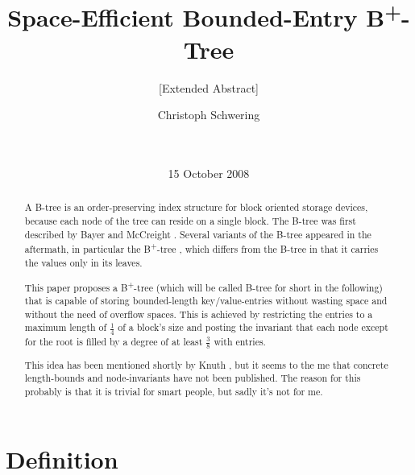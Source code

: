 \documentclass{vldb}
\begin{document}
\title{Space-Efficient Bounded-Entry B\textsuperscript{+}-Tree}
\subtitle{[Extended Abstract]}

\author{
\alignauthor
Christoph Schwering\\
   \\
   \\
}
\date{15 October 2008}


\maketitle

\begin{abstract}
A B-tree is an order-preserving index structure for block oriented storage
devices, because each node of the tree can reside on a single block.
The B-tree was first described by Bayer and McCreight \cite{Bayer}.
Several variants of the B-tree appeared in the aftermath, in particular the
B\textsuperscript{+}-tree \cite{Cormen, KnuthBTree}, which differs from the
B-tree in that it carries the values only in its leaves.

This paper proposes a B\textsuperscript{+}-tree (which will be called B-tree for
short in the following) that is capable of storing bounded-length
key/value-entries without wasting space and without the need of overflow spaces.
This is achieved by restricting the entries to a maximum length of
$\tfrac{1}{4}$ of a block's size and posting the invariant that each node except
for the root is filled by a degree of at least $\tfrac{3}{8}$ with entries.

This idea has been mentioned shortly by Knuth \cite{KnuthBTree}, but it seems
to the me that concrete length-bounds and node-invariants have not been
published.
The reason for this probably is that it is trivial for smart people, but sadly
it's not for me.
\end{abstract}


\section{Definition} %
\end{document}
